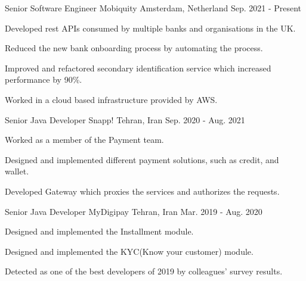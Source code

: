 

\begin{cventries}

  \cventry
    {Senior Software Engineer} %
    {Mobiquity} %
    {Amsterdam, Netherland} %
    {Sep. 2021 - Present} %
    {
      \begin{cvitems} %
        \item {Developed rest APIs consumed by multiple banks and organisations in the UK.}
        \item {Reduced the new bank onboarding process by automating the process.}
        \item {Improved and refactored secondary identification service which increased performance by 90\%.}
        \item {Worked in a cloud based infrastructure provided by AWS.}
      \end{cvitems}
    }

  \cventry
    {Senior Java Developer} %
    {Snapp!} %
    {Tehran, Iran} %
    {Sep. 2020 - Aug. 2021} %
    {
      \begin{cvitems} %
        \item {Worked as a member of the Payment team.}
        \item {Designed and implemented different payment solutions, such as credit, and wallet.}
        \item {Developed Gateway which proxies the services and authorizes the requests.}
      \end{cvitems}
    }

  \cventry
    {Senior Java Developer} %
    {MyDigipay} %
    {Tehran, Iran} %
    {Mar. 2019 - Aug. 2020} %
    {
      \begin{cvitems} %
        \item {Designed and implemented the Installment module.}
        \item {Designed and implemented the KYC(Know your customer) module.}
        \item {Detected as one of the best developers of 2019 by colleagues' survey results.}
      \end{cvitems}
    }


\end{cventries}
